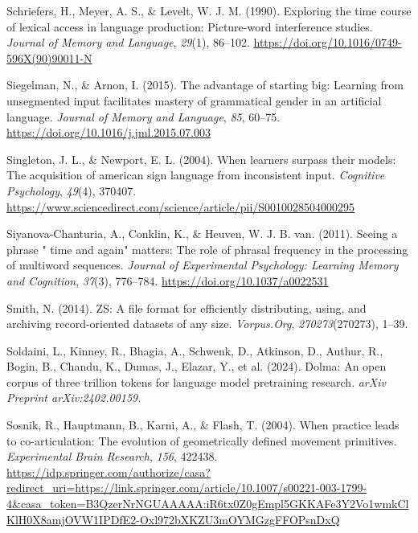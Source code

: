 \documentclass[
  12pt,
  letterpaper,
]{scrreport}
\newlength{\cslhangindent}
\newenvironment{CSLReferences}[2] %
 {\begin{list}{}{%
  \setlength{\itemindent}{0pt}
  \setlength{\leftmargin}{0pt}
  \setlength{\parsep}{0pt}
  \ifodd #1
   \setlength{\leftmargin}{\cslhangindent}
   \setlength{\itemindent}{-1\cslhangindent}
  \fi
  \setlength{\itemsep}{#2\baselineskip}}}
 {\end{list}}
\begin{document}
\begin{CSLReferences}{1}{0}
Schriefers, H., Meyer, A. S., \& Levelt, W. J. M. (1990). Exploring the
time course of lexical access in language production: Picture-word
interference studies. \emph{Journal of Memory and Language},
\emph{29}(1), 86--102.
\url{https://doi.org/10.1016/0749-596X(90)90011-N}

Siegelman, N., \& Arnon, I. (2015). The advantage of starting big:
Learning from unsegmented input facilitates mastery of grammatical
gender in an artificial language. \emph{Journal of Memory and Language},
\emph{85}, 60--75. \url{https://doi.org/10.1016/j.jml.2015.07.003}

Singleton, J. L., \& Newport, E. L. (2004). When learners surpass their
models: The acquisition of american sign language from inconsistent
input. \emph{Cognitive Psychology}, \emph{49}(4), 370407.
\url{https://www.sciencedirect.com/science/article/pii/S0010028504000295}

Siyanova-Chanturia, A., Conklin, K., \& Heuven, W. J. B. van. (2011).
Seeing a phrase {"} time and again{"} matters: The role of phrasal
frequency in the processing of multiword sequences. \emph{Journal of
Experimental Psychology: Learning Memory and Cognition}, \emph{37}(3),
776--784. \url{https://doi.org/10.1037/a0022531}

Smith, N. (2014). ZS: A file format for efficiently distributing, using,
and archiving record-oriented datasets of any size. \emph{Vorpus.Org},
\emph{270273}(270273), 1--39.

Soldaini, L., Kinney, R., Bhagia, A., Schwenk, D., Atkinson, D., Authur,
R., Bogin, B., Chandu, K., Dumas, J., Elazar, Y., et al. (2024). Dolma:
An open corpus of three trillion tokens for language model pretraining
research. \emph{arXiv Preprint arXiv:2402.00159}.

Sosnik, R., Hauptmann, B., Karni, A., \& Flash, T. (2004). When practice
leads to co-articulation: The evolution of geometrically defined
movement primitives. \emph{Experimental Brain Research}, \emph{156},
422438.
\url{https://idp.springer.com/authorize/casa?redirect_uri=https://link.springer.com/article/10.1007/s00221-003-1799-4&casa_token=B3QzerNrNGUAAAAA:iR6tx0Z0gEmpl5GKKAFe3Y2Vo1wmkClKlH0X8amjOVW1IPDfE2-Oxl972bXKZU3mOYMGzgFFOPsnDxQ}


\end{CSLReferences}
\end{document}
